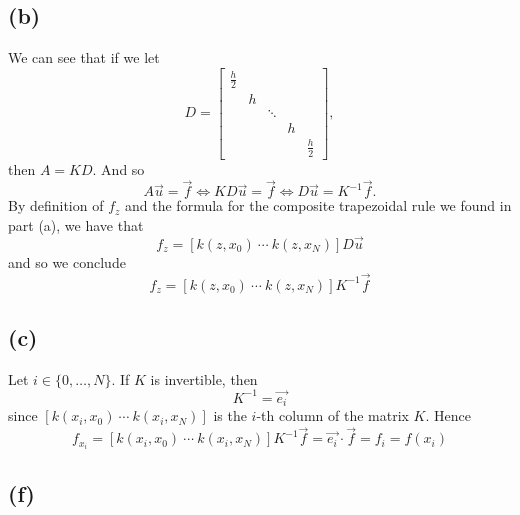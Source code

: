 \documentclass{article}
\begin{document}
\subsection*{(b)}
We can see that if we let
\begin{equation*}
	D =
	\begin{bmatrix}
		\frac{h}{2} & & & & \\
		 & h & & & \\
		 & & \ddots & & \\
		 & & & h & \\
		 & & & & \frac{h}{2}
	\end{bmatrix},
\end{equation*}
then $A = KD$. And so
\begin{equation*}
	A\vec{u} = \vec{f} \iff KD\vec{u} = \vec{f}
		\iff D\vec{u} = K^{-1}\vec{f}.
\end{equation*}
By definition of $f_z$ and the formula for the composite trapezoidal
rule we found in part (a), we have that
\begin{equation*}
	f_z = [k(z, x_0)~\cdots~k(z, x_N)]D\vec{u}
\end{equation*}
and so we conclude
\begin{equation*}
	f_z = [k(z, x_0)~\cdots~k(z, x_N)]K^{-1}\vec{f}
\end{equation*}

\subsection*{(c)}
Let $i \in \{0, \dots, N\}$. If $K$ is invertible, then
\begin{equation*}
	[k(x_i, x_0)~\cdots~k(x_i, x_N)]K^{-1} = \vec{e_i}
\end{equation*}
since $[k(x_i, x_0)~\cdots~k(x_i, x_N)]$ is the $i$-th column of
the matrix $K$.
Hence
\begin{equation*}
	f_{x_i} = [k(x_i, x_0)~\cdots~k(x_i, x_N)]K^{-1}\vec{f}
	= \vec{e_i}\cdot\vec{f} = f_i = f(x_i)
\end{equation*}

\subsection*{(f)}
\end{document}
